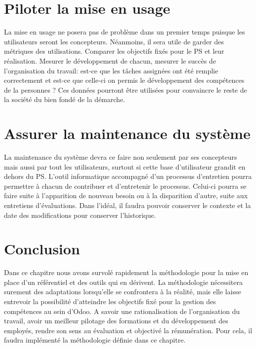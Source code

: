 \section{Piloter la mise en usage}
La mise en usage ne posera pas de problème dans un premier temps puisque les utilisateurs seront les concepteurs. Néanmoins, il sera utile de garder des métriques des utilisations. Comparer les objectifs fixés pour le PS et leur réalisation. Mesurer le développement de chacun, mesurer le succès de l'organisation du travail: est-ce que les tâches assignées ont été remplie correctement et est-ce que celle-ci on permis le développement des compétences de la personnes ? Ces données pourront être utilisées pour convaincre le reste de la société du bien fondé de la démarche. 

\section{Assurer la maintenance du système}
La maintenance du système devra ce faire non seulement par ses concepteurs mais aussi par tout les utilisateurs, surtout si cette base d'utilisateur grandit en dehors du PS. L'outil informatique accompagné d'un processus d'entretien pourra permettre à chacun de contribuer et d'entretenir le processus. Celui-ci pourra se faire suite à l'apparition de nouveau besoin ou à la disparition d'autre, suite aux entretiens d'évaluations. Dans l'idéal, il faudra pouvoir conserver le contexte et la date des modifications pour conserver l'historique.
 
 
 \section{Conclusion}
 Dans ce chapitre nous avons survolé rapidement la méthodologie pour la mise en place d'un référentiel et des outils qui en dérivent. La méthodologie nécessitera surement des adaptations lorsqu'elle se confrontera à la réalité, mais elle laisse entrevoir la possibilité d'atteindre les objectifs fixé pour la gestion des compétences au sein d'Odoo. A savoir une rationalisation de l'organisation du travail, avoir un meilleur pilotage des formations et du développement des employés, rendre son sens au évaluation et objectivé la rémunération. Pour cela, il faudra implémenté la méthodologie définie dans ce chapitre.




